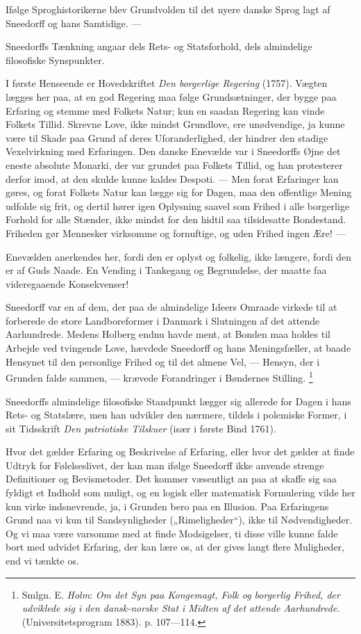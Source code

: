 \documentclass[12pt,a4paper,openany]{book}
\newcommand{\opage}[1]{\marginnote{\footnotesize\textit{[#1]}}}
\begin{document}
Ifølge Sproghistorikerne blev Grundvolden til det nyere danske Sprog lagt af
Sneedorff og hans Samtidige. ---

Sneedorffs Tænkning angaar dels Rets- og Statsforhold, dels almindelige
filosofiske Synspunkter.

I første Henseende er Hovedskriftet \textit{Den borgerlige Regering} (1757).
Vægten lægges her paa, at en god Regering maa følge Grundsætninger, der bygge
paa Erfaring og stemme med Folkets Natur; kun en saadan Regering kan vinde
Folkets Tillid. Skrevne Love, ikke mindst Grundlove, ere unødvendige, ja kunne
være til Skade paa Grund af deres Uforanderlighed, der hindrer den stadige
Vexelvirkning med Erfaringen. Den danske Enevælde var i Sneedorffs Øjne det
eneste absolute Monarki, der var grundet paa Folkets Tillid, og han protesterer
derfor imod, at den skulde kunne kaldes Despoti. --- Men forat Erfaringer kan
gøres, og forat Folkets Natur kan lægge sig for Dagen, maa den offentlige
Mening udfolde sig frit, og dertil hører igen Oplysning saavel som Frihed i
alle borgerlige Forhold for alle Stænder, ikke mindst for den hidtil saa
tilsidesatte Bondestand. Friheden gør Mennesker virksomme og fornuftige, og
uden Frihed ingen Ære! ---

Enevælden anerkendes her, fordi den er oplyst og folkelig, ikke længere, fordi
den er af Guds Naade. En Vending i Tankegang og Begrundelse, der maatte faa
videregaaende Konsekvenser!

Sneedorff var en af dem, der paa de almindelige Ideers Omraade virkede til at
forberede de store Landboreformer i Danmark i Slutningen af det attende
Aarhundrede. Medens Holberg endnu havde ment, at Bonden maa holdes til Arbejde
ved tvingende Love, hævdede Sneedorff og hans Meningsfæller, at baade Hensynet
til den personlige Frihed og til det almene Vel, --- Hensyn, der i Grunden
falde sammen, --- krævede Forandringer i Bøndernes Stilling.%
\footnote[1]{Smlgn. E. \emph{Holm}: \textit{Om det Syn paa Kongemagt, Folk og
borgerlig Frihed, der udviklede sig i den dansk-norske Stat i Midten af det
attende Aarhundrede.} (Universitetsprogram 1883). p. 107---114.}

\setcounter{footnote}{0}%
\opage{18}Sneedorffs almindelige filosofiske Standpunkt lægger sig allerede for
Dagen i hans Rets- og Statslære, men han udvikler den nærmere, tildels i
polemiske Former, i sit Tidsskrift \textit{Den patriotiske Tilskuer} (især i
første Bind 1761).

Hvor det gælder Erfaring og Beskrivelse af Erfaring, eller hvor det gælder at
finde Udtryk for Følelseslivet, der kan man ifølge Sneedorff ikke anvende
strenge Definitioner og Bevismetoder. Det kommer væsentligt an paa at skaffe
sig saa fyldigt et Indhold som muligt, og en logisk eller matematisk
Formulering vilde her kun virke indsnevrende, ja, i Grunden bero paa en
Illusion. Paa Erfaringens Grund naa vi kun til Sandsynligheder
(„Rimeligheder“), ikke til Nødvendigheder. Og vi maa være varsomme med at finde
Modsigelser, ti disse ville kunne falde bort med udvidet Erfaring, der kan lære
os, at der gives langt flere Muligheder, end vi tænkte os.
\end{document}
